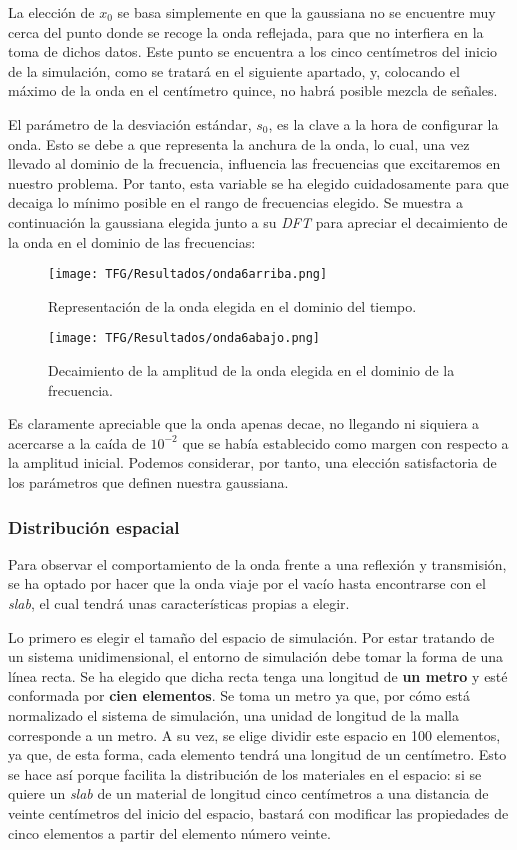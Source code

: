 \documentclass[11pt,a4paper,twoside,pdf]{article}
\numberwithin{equation}{section}
\begin{document}
La elección de $x_0$ se basa simplemente en que la gaussiana no se encuentre muy cerca del punto donde se recoge la onda reflejada, para que no interfiera en la toma de dichos datos. Este punto se encuentra a los cinco centímetros del inicio de la simulación, como se tratará en el siguiente apartado, y, colocando el máximo de la onda en el centímetro quince, no habrá posible mezcla de señales.

El parámetro de la desviación estándar, $s_0$, es la clave a la hora de configurar la onda. Esto se debe a que representa la anchura de la onda, lo cual, una vez llevado al dominio de la frecuencia, influencia las frecuencias que excitaremos en nuestro problema. Por tanto, esta variable se ha elegido cuidadosamente para que decaiga lo mínimo posible en el rango de frecuencias elegido. Se muestra a continuación la gaussiana elegida junto a su \textit{DFT} para apreciar el decaimiento de la onda en el dominio de las frecuencias:
\begin{figure}[H]
\centering
\texttt{[image: TFG/Resultados/onda6arriba.png]}	
\caption{Representación de la onda elegida en el dominio del tiempo.}
\end{figure}

\begin{figure}[H]
\centering
\texttt{[image: TFG/Resultados/onda6abajo.png]}	
\caption{Decaimiento de la amplitud de la onda elegida en el dominio de la frecuencia.}
\end{figure}

Es claramente apreciable que la onda apenas decae, no llegando ni siquiera a acercarse a la caída de $10^{-2}$ que se había establecido como margen con respecto a la amplitud inicial. Podemos considerar, por tanto, una elección satisfactoria de los parámetros que definen nuestra gaussiana.

\subsubsection{Distribución espacial} \label{ap412}
Para observar el comportamiento de la onda frente a una reflexión y transmisión, se ha optado por hacer que la onda viaje por el vacío hasta encontrarse con el \textit{slab}, el cual tendrá unas características propias a elegir.

Lo primero es elegir el tamaño del espacio de simulación. Por estar tratando de un sistema unidimensional, el entorno de simulación debe tomar la forma de una línea recta. Se ha elegido que dicha recta tenga una longitud de \textbf{un metro} y esté conformada por \textbf{cien elementos}. Se toma un metro ya que, por cómo está normalizado el sistema de simulación, una unidad de longitud de la malla corresponde a un metro. A su vez, se elige dividir este espacio en 100 elementos, ya que, de esta forma, cada elemento tendrá una longitud de un centímetro. Esto se hace así porque facilita la distribución de los materiales en el espacio: si se quiere un \textit{slab} de un material de longitud cinco centímetros a una distancia de veinte centímetros del inicio del espacio, bastará con modificar las propiedades de cinco elementos a partir del elemento número veinte.
\end{document}
